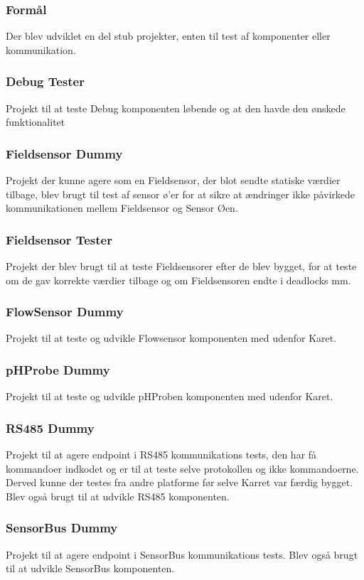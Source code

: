 \subsubsection{Formål}
Der blev udviklet en del stub projekter, enten til test af komponenter eller kommunikation.

\subsubsection{Debug Tester}
Projekt til at teste Debug komponenten løbende og at den havde den ønskede funktionalitet

\subsubsection{Fieldsensor Dummy}
Projekt der kunne agere som en Fieldsensor, der blot sendte statiske værdier tilbage, blev brugt til test af sensor ø'er for at sikre at ændringer ikke påvirkede kommunikationen mellem Fieldsensor og Sensor Øen.

\subsubsection{Fieldsensor Tester}
Projekt der blev brugt til at teste Fieldsensorer efter de blev bygget, for at teste om de gav korrekte værdier tilbage og om Fieldsensoren endte i deadlocks mm.

\subsubsection{FlowSensor Dummy}
Projekt til at teste og udvikle Flowsensor komponenten med udenfor Karet.

\subsubsection{pHProbe Dummy}
Projekt til at teste og udvikle pHProben komponenten med udenfor Karet.

\subsubsection{RS485 Dummy}
Projekt til at agere endpoint i RS485 kommunikations tests, den har få kommandoer indkodet og er til at teste selve protokollen og ikke kommandoerne. Derved kunne der testes fra andre platforme før selve Karret var færdig bygget. Blev også brugt til at udvikle RS485 komponenten.

\subsubsection{SensorBus Dummy}
Projekt til at agere endpoint i SensorBus kommunikations tests. Blev også brugt til at udvikle SensorBus komponenten.